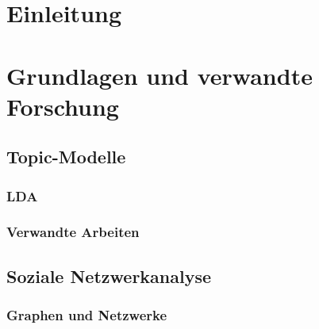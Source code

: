 \documentclass[11pt,a4paper,twoside]{article}
\begin{document}
{
\setcounter{tocdepth}{3}
\tableofcontents
}
\cleardoublepage

\setcounter{page}{1}

\fancyhead[LE,RO]{\rightmark}
\fancyhead[LO,RE]{\leftmark}
\fancyfoot[LE,RO]{\thepage}

\cleardoublepage

\hypertarget{einleitung}{%
\section{Einleitung}\label{einleitung}}


\cleardoublepage

\hypertarget{grundlagen-und-verwandte-forschung}{%
\section{Grundlagen und verwandte
Forschung}\label{grundlagen-und-verwandte-forschung}}

\hypertarget{topic-modelle}{%
\subsection{Topic-Modelle}\label{topic-modelle}}

\hypertarget{lda}{%
\subsubsection{LDA}\label{lda}}

\hypertarget{verwandte-arbeiten}{%
\subsubsection{Verwandte Arbeiten}\label{verwandte-arbeiten}}

\hypertarget{soziale-netzwerkanalyse}{%
\subsection{Soziale Netzwerkanalyse}\label{soziale-netzwerkanalyse}}

\hypertarget{graphen-und-netzwerke}{%
\subsubsection{Graphen und Netzwerke}\label{graphen-und-netzwerke}}
\end{document}
